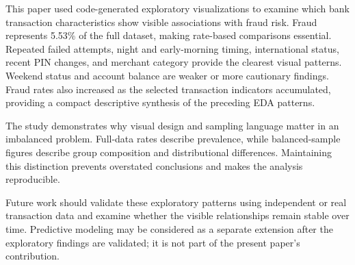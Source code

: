 \documentclass[conference,final,]{IEEEtran}
\begin{document}
This paper used code-generated exploratory visualizations to examine
which bank transaction characteristics show visible associations with
fraud risk. Fraud represents 5.53\% of the full dataset, making
rate-based comparisons essential. Repeated failed attempts, night and
early-morning timing, international status, recent PIN changes, and
merchant category provide the clearest visual patterns. Weekend status
and account balance are weaker or more cautionary findings. Fraud rates
also increased as the selected transaction indicators accumulated,
providing a compact descriptive synthesis of the preceding EDA patterns.

The study demonstrates why visual design and sampling language matter in
an imbalanced problem. Full-data rates describe prevalence, while
balanced-sample figures describe group composition and distributional
differences. Maintaining this distinction prevents overstated
conclusions and makes the analysis reproducible.

Future work should validate these exploratory patterns using independent
or real transaction data and examine whether the visible relationships
remain stable over time. Predictive modeling may be considered as a
separate extension after the exploratory findings are validated; it is
not part of the present paper's contribution.

\renewcommand\refname{References}

\end{document}
